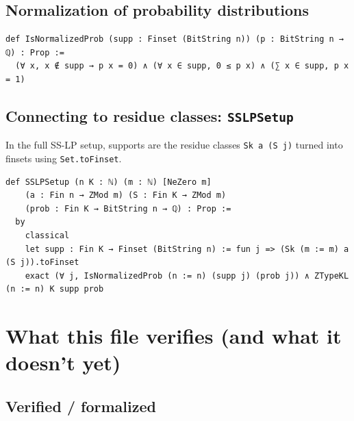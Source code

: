 \documentclass[11pt]{article}
\begin{document}
\subsection*{Normalization of probability distributions}

\begin{lstlisting}
def IsNormalizedProb (supp : Finset (BitString n)) (p : BitString n → ℚ) : Prop :=
  (∀ x, x ∉ supp → p x = 0) ∧ (∀ x ∈ supp, 0 ≤ p x) ∧ (∑ x ∈ supp, p x = 1)
\end{lstlisting}

\subsection*{Connecting to residue classes: \texttt{SSLPSetup}}

In the full SS-LP setup, supports are the residue classes \texttt{Sk a (S j)} turned into finsets using \texttt{Set.toFinset}.

\begin{lstlisting}
def SSLPSetup (n K : ℕ) (m : ℕ) [NeZero m]
    (a : Fin n → ZMod m) (S : Fin K → ZMod m)
    (prob : Fin K → BitString n → ℚ) : Prop :=
  by
    classical
    let supp : Fin K → Finset (BitString n) := fun j => (Sk (m := m) a (S j)).toFinset
    exact (∀ j, IsNormalizedProb (n := n) (supp j) (prob j)) ∧ ZTypeKL (n := n) K supp prob
\end{lstlisting}

\section*{What this file verifies (and what it doesn't yet)}

\subsection*{Verified / formalized}
\end{document}

